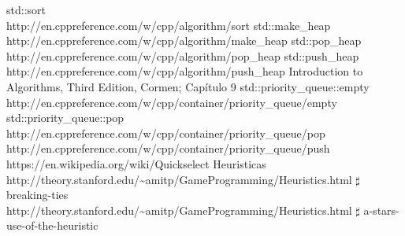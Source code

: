 \newpage

\renewcommand\refname{Referencias}
\begin{thebibliography}{X}
 std::sort\\ http://en.cppreference.com/w/cpp/algorithm/sort
 std::make\_heap\\http://en.cppreference.com/w/cpp/algorithm/make\_heap
 std::pop\_heap\\ http://en.cppreference.com/w/cpp/algorithm/pop\_heap
 std::push\_heap\\http://en.cppreference.com/w/cpp/algorithm/push\_heap
 Introduction to Algorithms, Third Edition, Cormen; Capítulo 9
 std::priority\_queue::empty\\
http://en.cppreference.com/w/cpp/container/priority\_queue/empty
 std::priority\_queue::pop\\ http://en.cppreference.com/w/cpp/container/priority\_queue/pop
 \\ http://en.cppreference.com/w/cpp/container/priority\_queue/push 
 \\ https://en.wikipedia.org/wiki/Quickselect
 Heuristicas \\
http://theory.stanford.edu/\textasciitilde amitp/GameProgramming/Heuristics.html $\sharp$ breaking-ties\\
http://theory.stanford.edu/\textasciitilde amitp/GameProgramming/Heuristics.html $\sharp$ a-stars-use-of-the-heuristic
\end{thebibliography}
\newpage

